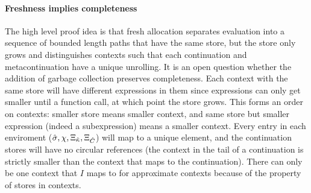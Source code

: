 \paragraph{Freshness implies completeness}
The high level proof idea is that fresh allocation separates evaluation into a sequence of bounded length paths that have the same store, but the store only grows and distinguishes contexts such that each continuation and metacontinuation have a unique unrolling.
%
It is an open question whether the addition of garbage collection preserves completeness.
%
Each context with the same store will have different expressions in them since expressions can only get smaller until a function call, at which point the store grows.
%
This forms an order on contexts: smaller store means smaller context, and same store but smaller expression (indeed a subexpression) means a smaller context.
%
Every entry in each enviroment (${\hat\sigma},\chi,\Xi_{\hat{\kappa}},\Xi_{\hat{C}}$) will map to a unique element, and the continuation stores will have no circular references (the context in the tail of a continuation is strictly smaller than the context that maps to the continuation).
%
There can only be one context that $I$ maps to for approximate contexts because of the property of stores in contexts.

